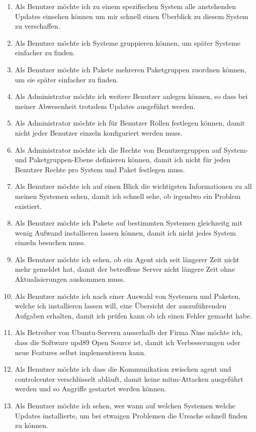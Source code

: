 \begin{enumerate}
    \item Als Benutzer möchte ich zu einem spezifischen System alle anstehenden Updates einsehen können um mir schnell einen Überblick zu diesem System zu verschaffen.
    \item Als Benutzer möchte ich Systeme gruppieren können, um später Systeme einfacher zu finden.
    \item Als Benutzer möchte ich Pakete mehreren Paketgruppen zuordnen können, um sie später einfacher zu finden.
    \item Als Administrator möchte ich weitere Benutzer anlegen können, so dass bei meiner Abwesenheit trotzdem Updates ausgeführt werden.
    \item Als Administrator möchte ich für Benutzer Rollen festlegen können, damit nicht jeder Benutzer einzeln konfiguriert werden muss.
    \item Als Administrator möchte ich die Rechte von Benutzergruppen auf System- und Paketgruppen-Ebene definieren können, damit ich nicht für jeden Benutzer Rechte pro System und Paket festlegen muss.
    \item Als Benutzer möchte ich auf einen Blick die wichtigsten Informationen zu all meinen Systemen sehen, damit ich schnell sehe, ob irgendwo ein Problem existiert.
    \item Als Benutzer möchte ich Pakete auf bestimmten Systemen gleichzeitg mit wenig Aufwand installieren lassen können, damit ich nicht jedes System einzeln besuchen muss.
    \item Als Benutzer möchte ich sehen, ob ein Agent sich seit längerer Zeit nicht mehr gemeldet hat, damit der betroffene Server nicht längere Zeit ohne Aktualisierungen auskommen muss.
    \item Als Benutzer möchte ich nach einer Auswahl von Systemen und Paketen, welche ich installieren lassen will, eine Übersicht der auszuführenden Aufgaben erhalten, damit ich prüfen kann ob ich einen Fehler gemacht habe.
    \item Als Betreiber von Ubuntu-Servern ausserhalb der Firma Nine möchte ich, dass die Software \gls{upd89} Open Source ist, damit ich Verbesserungen oder neue Features selbst implementieren kann.
    \item Als Benutzer möchte ich dass die Kommunikation zwischen \gls{agent} und \gls{controlcenter} verschlüsselt abläuft, damit keine \gls{mitm}-Attacken ausgeführt werden und so Angriffe gestartet werden können.
    \item Als Benutzer möchte ich sehen, wer wann auf welchen Systemen welche Updates installierte, um bei etwaigen Problemen die Ursache schnell finden zu können.

\end{enumerate}
